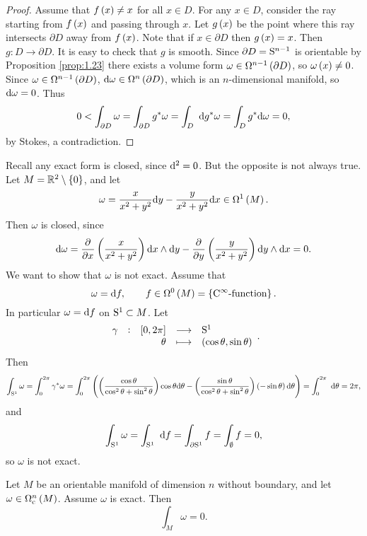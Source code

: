 \begin{proof}
Assume that $ f\br{x} \ne x $ for all $ x \in D $. For any $ x \in D $, consider the ray starting from $ f\br{x} $ and passing through $ x $. Let $ g\br{x} $ be the point where this ray intersects $ \partial D $ away from $ f\br{x} $. Note that if $ x \in \partial D $ then $ g\br{x} = x $. Then $ g : D \to \partial D $. It is easy to check that $ g $ is smooth. Since $ \partial D = \S^{n - 1} $ is orientable by Proposition \ref{prop:1.23} there exists a volume form $ \omega \in \Omega^{n - 1}\br{\partial D} $, so $ \omega\br{x} \ne 0 $. Since $ \omega \in \Omega^{n - 1}\br{\partial D} $, $ \d\omega \in \Omega^n\br{\partial D} $, which is an $ n $-dimensional manifold, so $ \d\omega = 0 $. Thus
$$ 0 < \int_{\partial D} \omega = \int_{\partial D} g^*\omega = \intd{D}{}{}{g^*\omega} = \int_D g^*\d\omega = 0, $$
by Stokes, a contradiction.
\end{proof}

\begin{example}
Recall any exact form is closed, since $ \d^2 = 0 $. But the opposite is not always true. Let $ M = \RR^2 \setminus \cbr{0} $, and let
$$ \omega = \dfrac{x}{x^2 + y^2} \d y - \dfrac{y}{x^2 + y^2} \d x \in \Omega^1\br{M}. $$
Then $ \omega $ is closed, since
$$ \d\omega = \dpd{}{x}\br{\dfrac{x}{x^2 + y^2}} \d x \wedge \d y - \dpd{}{y}\br{\dfrac{y}{x^2 + y^2}} \d y \wedge \d x = 0. $$
We want to show that $ \omega $ is not exact. Assume that
$$ \omega = \d f, \qquad f \in \Omega^0\br{M} = \cbr{\text{$ \C^\infty $-function}}. $$
In particular $ \omega = \d f $ on $ \S^1 \subset M $. Let
$$ \function[\gamma]{\sbr{0, 2\pi}}{\S^1}{\theta}{\br{\cos \theta, \sin \theta}}. $$
Then
$$ \int_{\S^1} \omega = \int_0^{2\pi} \gamma^*\omega = \int_0^{2\pi} \br{\br{\dfrac{\cos \theta}{\cos^2 \theta + \sin^2 \theta}}\cos \theta \d\theta - \br{\dfrac{\sin \theta}{\cos^2 \theta + \sin^2 \theta}}\br{-\sin \theta} \d\theta} = \intd{0}{2\pi}{}{\theta} = 2\pi, $$
and
$$ \int_{\S^1} \omega = \intd{\S^1}{}{}{f} = \int_{\partial\S^1} f = \int_\emptyset f = 0, $$
so $ \omega $ is not exact.
\end{example}

\pagebreak

\begin{theorem}
Let $ M $ be an orientable manifold of dimension $ n $ without boundary, and let $ \omega \in \Omega_\c^n\br{M} $. Assume $ \omega $ is exact. Then
$$ \int_M \omega = 0. $$
\end{theorem}


